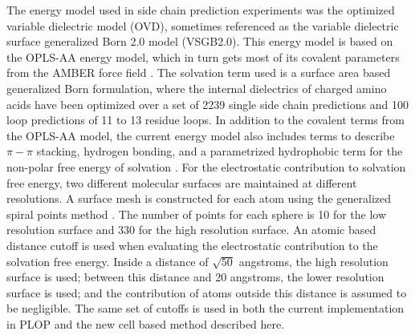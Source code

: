 The energy model used in side chain prediction experiments was the optimized variable dielectric model (OVD), sometimes referenced as the variable dielectric surface generalized Born 2.0 model (VSGB2.0).
This energy model is based on the OPLS-AA energy model, which in turn gets most of its covalent parameters from the AMBER force field \cite{jorgensen1996development}.
The solvation term used is a surface area based generalized Born formulation, where the internal dielectrics of charged amino acids have been optimized over a set of 2239 single side chain predictions and 100 loop predictions of 11 to 13 residue loops.
In addition to the covalent terms from the OPLS-AA model, the current energy model also includes terms to describe $\pi-\pi$ stacking, hydrogen bonding, and a parametrized hydrophobic term for the non-polar free energy of solvation \cite{li2011vsgb}.
For the electrostatic contribution to solvation free energy, two different molecular surfaces are maintained at different resolutions.
A surface mesh is constructed for each atom using the generalized spiral points method \cite{rakhmanov1994minimal,saff1997distributing,zhou1995arrangements}.
The number of points for each sphere is 10 for the low resolution surface and 330 for the high resolution surface.
An atomic based distance cutoff is used when evaluating the electrostatic contribution to the solvation free energy.
Inside a distance of $\sqrt{50}$ angstroms, the high resolution surface is used; between this distance and 20 angstroms, the lower resolution surface is used; and the contribution of atoms outside this distance is assumed to be negligible.
The same set of cutoffs is used in both the current implementation in PLOP and the new cell based method described here.
